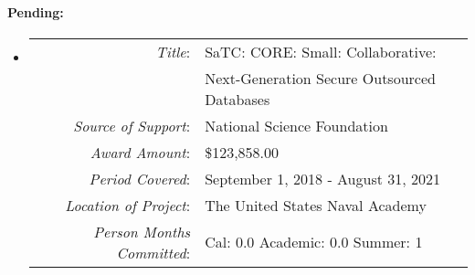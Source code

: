 \documentclass[10pt]{article}
\begin{document}
\paragraph{\bf Pending:}

\begin{itemize}
\item[]
  \begin{tabular} {r l}
    {\em Title}: & SaTC: CORE: Small: Collaborative: \\
     &  Next-Generation Secure Outsourced Databases \\
    {\em Source of Support}: & National Science Foundation \\
    {\em Award Amount}: & \$123,858.00 \\
    {\em Period Covered}: & September 1, 2018 - August 31, 2021\\
    {\em Location of Project}: & The United States Naval Academy \\
    {\em Person Months Committed}: & Cal: 0.0 Academic: 0.0 Summer: 1\\
 \end{tabular}

  

 


\end{itemize}
\end{document}

